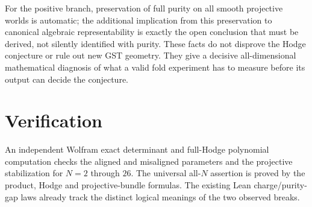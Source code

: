 \documentclass[11pt]{article}
\begin{document}
For the positive branch, preservation of full purity
on all smooth projective worlds is automatic; the
additional implication from this preservation to
canonical algebraic representability is exactly the
open conclusion that must be derived, not silently
identified with purity. These facts do not disprove
the Hodge conjecture or rule out new GST geometry.
They give a decisive all-dimensional mathematical
diagnosis of what a valid fold experiment has to
measure before its output can decide the conjecture.

\section{Verification}
An independent Wolfram exact determinant and full-Hodge
polynomial computation checks the aligned and misaligned
parameters and the projective stabilization for $N=2$
through $26$. The universal all-$N$ assertion is proved
by the product, Hodge and projective-bundle formulas.
The existing Lean charge/purity-gap laws already track
the distinct logical meanings of the two observed breaks.
\end{document}
